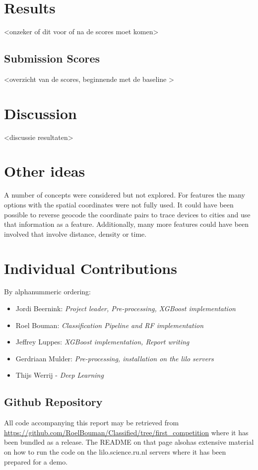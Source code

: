 \documentclass[runningheads,a4paper]{llncs}
\begin{document}
\section{Results}
<onzeker of dit voor of na de scores moet komen>
\subsection{Submission Scores}
<overzicht van de scores, beginnende met de baseline >
\section{Discussion}
<discussie resultaten>
\section{Other ideas}
A number of concepts were considered but not explored. For features the many options with the spatial coordinates were not fully used. It could have been possible to reverse geocode the coordinate pairs to trace devices to cities and use that information as a feature. Additionally, many more features could have been involved that involve distance, density or time.

\section{Individual Contributions}
By alphanummeric ordering:
\begin{itemize}
\item Jordi Beernink: \textit{Project leader, Pre-processing, XGBoost implementation}
\item Roel Bouman: \textit{Classification Pipeline and RF implementation}
\item Jeffrey Luppes: \textit{XGBoost implementation, Report writing}
\item Gerdriaan Mulder: \textit{Pre-processing, installation on the lilo servers}
\item Thijs Werrij - \textit{Deep Learning}
\end{itemize}
\subsection{Github Repository}
All code accompanying this report may be retrieved from \url{https://github.com/RoelBouman/Classified/tree/first_competition} where it has been bundled as a release. The README on that page alsohas extensive material on how to run the code on the lilo.science.ru.nl servers where it has been prepared for a demo. 
\medskip

\nocite{*} 
\end{document}
